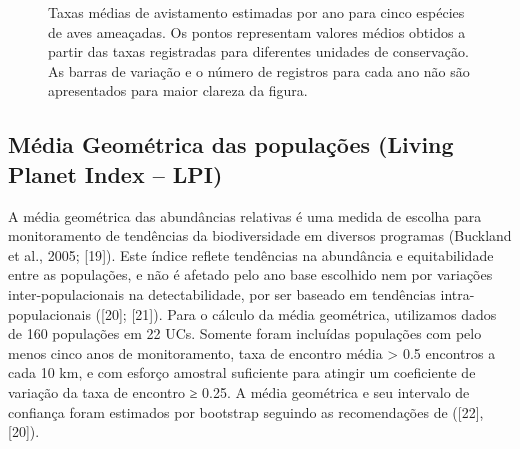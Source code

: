 \documentclass[
  letterpaper,
]{scrbook}
\begin{document}
\begin{figure}[H]


\caption{\label{fig-especies-ameacadas-aves}Taxas médias de avistamento
estimadas por ano para cinco espécies de aves ameaçadas. Os pontos
representam valores médios obtidos a partir das taxas registradas para
diferentes unidades de conservação. As barras de variação e o número de
registros para cada ano não são apresentados para maior clareza da
figura.}

\end{figure}%

\subsection{Média Geométrica das populações (Living Planet Index --
LPI)}\label{muxe9dia-geomuxe9trica-das-populauxe7uxf5es-living-planet-index-lpi}

A média geométrica das abundâncias relativas é uma medida de escolha
para monitoramento de tendências da biodiversidade em diversos programas
(Buckland et al., 2005; {[}19{]}). Este índice reflete tendências na
abundância e equitabilidade entre as populações, e não é afetado pelo
ano base escolhido nem por variações inter-populacionais na
detectabilidade, por ser baseado em tendências intra-populacionais
({[}20{]}; {[}21{]}). Para o cálculo da média geométrica, utilizamos
dados de 160 populações em 22 UCs. Somente foram incluídas populações
com pelo menos cinco anos de monitoramento, taxa de encontro média
\textgreater{} 0.5 encontros a cada 10 km, e com esforço amostral
suficiente para atingir um coeficiente de variação da taxa de encontro ≥
0.25. A média geométrica e seu intervalo de confiança foram estimados
por bootstrap seguindo as recomendações de ({[}22{]}, {[}20{]}).
\end{document}
